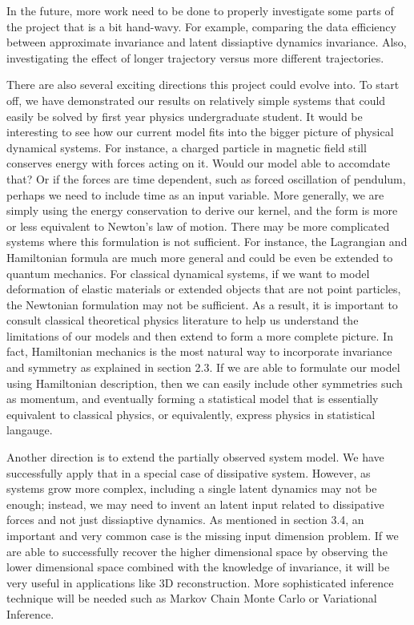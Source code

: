 \documentclass{statsmsc}
\begin{document}
In the future, more work need to be done to properly investigate some parts of the project that is a bit hand-wavy. For example, comparing the data efficiency between approximate invariance and latent dissiaptive dynamics invariance.
Also, investigating the effect of longer trajectory versus more different trajectories.

There are also several exciting directions this project could evolve into.
To start off, we have demonstrated our results on relatively simple systems that could easily be solved by first year physics undergraduate student. 
It would be interesting to see how our current model fits into the bigger picture of physical dynamical systems.
For instance, a charged particle in magnetic field still conserves energy with forces acting on it. 
Would our model able to accomdate that?
Or if the forces are time dependent, such as forced oscillation of pendulum, perhaps we need to include time as an input variable.
More generally, we are simply using the energy conservation to derive our kernel, and the form is more or less equivalent to Newton's law of motion.
There may be more complicated systems where this formulation is not sufficient.
For instance, the Lagrangian and Hamiltonian formula are much more general and could be even be extended to quantum mechanics.
For classical dynamical systems, if we want to model deformation of elastic materials or extended objects that are not point particles, the Newtonian formulation may not be sufficient.
As a result, it is important to consult classical theoretical physics literature to help us understand the limitations of our models and then extend to form a more complete picture.  
In fact, Hamiltonian mechanics is the most natural way to incorporate invariance and symmetry as explained in section 2.3.
If we are able to formulate our model using Hamiltonian description, then we can easily include other symmetries such as momentum, and eventually forming a statistical model that is essentially equivalent to classical physics, or equivalently, express physics in statistical langauge.

Another direction is to extend the partially observed system model.
We have successfully apply that in a special case of dissipative system.
However, as systems grow more complex, including a single latent dynamics may not be enough; instead, we may need to invent an latent input related to dissipative forces and not just dissiaptive dynamics.
As mentioned in section 3.4, an important and very common case is the missing input dimension problem.
If we are able to successfully recover the higher dimensional space by observing the lower dimensional space combined with the knowledge of invariance, it will be very useful in applications like 3D reconstruction.
More sophisticated inference technique will be needed such as Markov Chain Monte Carlo or Variational Inference.
\end{document}
